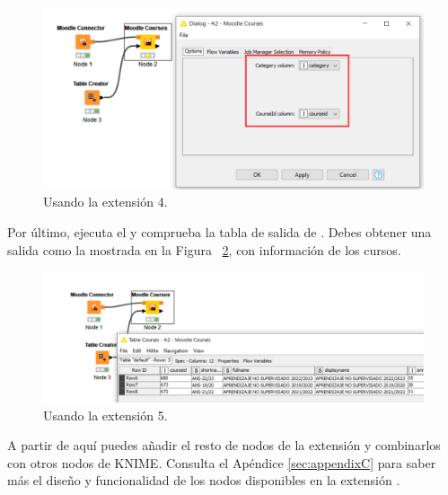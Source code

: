 \begin{figure}[!htb]
	\centering
	\includegraphics[width=1\textwidth]{img/manual_usuario_moodle_courses_config.png}
	\caption{Usando la extensión  4.}
	\label{fig:extension4}
\end{figure}
\FloatBarrier

Por último, ejecuta el  y comprueba la tabla de salida de . Debes obtener una 
salida como la mostrada en la Figura ~\ref{fig:extension5}, con información de los cursos.  

\begin{figure}[!htb]
	\centering
	\includegraphics[width=1\textwidth]{img/manual_usuario_moodle_courses_list.png}
	\caption{Usando la extensión  5.}
	\label{fig:extension5}
\end{figure}
\FloatBarrier

A partir de aquí puedes añadir el resto de nodos de la extensión y combinarlos con otros nodos de KNIME. 
Consulta el Apéndice \ref{sec:appendixC} para saber más el diseño y funcionalidad de los nodos disponibles en la extensión . 
